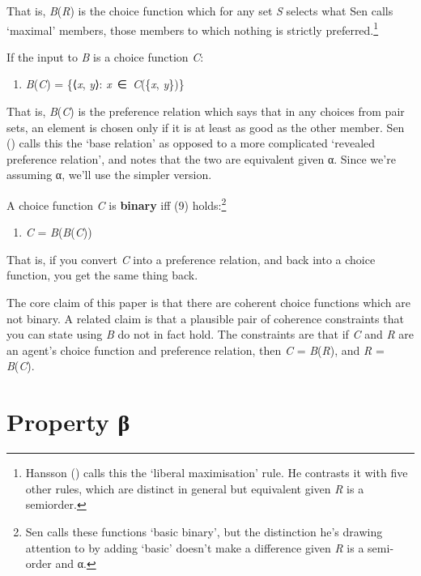 \documentclass[
  11pt,
  letterpaper,
  DIV=11,
  numbers=noendperiod,
  twoside]{scrartcl}
\providecommand{\tightlist}{%
  \setlength{\itemsep}{0pt}\setlength{\parskip}{0pt}}
\begin{document}
That is, \emph{B}(\emph{R}) is the choice function which for any set
\emph{S} selects what Sen calls `maximal' members, those members to
which nothing is strictly preferred.\footnote{Hansson
  () calls this the `liberal
  maximisation' rule. He contrasts it with five other rules, which are
  distinct in general but equivalent given \emph{R} is a semiorder.}

If the input to \emph{B} is a choice function \emph{C}:

\begin{enumerate}
\def\labelenumi{(\arabic{enumi})}
\setcounter{enumi}{7}
\tightlist
\item
  \emph{B}(\emph{C}) = \{⟨\emph{x}, \emph{y}⟩:
  \emph{x}~∈~\emph{C}(\{\emph{x}, \emph{y}\})\}
\end{enumerate}

That is, \emph{B}(\emph{C}) is the preference relation which says that
in any choices from pair sets, an element is chosen only if it is at
least as good as the other member. Sen
() calls this the `base
relation' as opposed to a more complicated `revealed preference
relation', and notes that the two are equivalent given α. Since we're
assuming α, we'll use the simpler version.

A choice function \emph{C} is \textbf{binary} iff (9) holds:\footnote{Sen
  calls these functions `basic binary', but the distinction he's drawing
  attention to by adding `basic' doesn't make a difference given
  \emph{R} is a semi-order and α.}

\begin{enumerate}
\def\labelenumi{(\arabic{enumi})}
\setcounter{enumi}{8}
\tightlist
\item
  \emph{C} = \emph{B}(\emph{B}(\emph{C}))
\end{enumerate}

That is, if you convert \emph{C} into a preference relation, and back
into a choice function, you get the same thing back.

The core claim of this paper is that there are coherent choice functions
which are not binary. A related claim is that a plausible pair of
coherence constraints that you can state using \emph{B} do not in fact
hold. The constraints are that if \emph{C} and \emph{R} are an agent's
choice function and preference relation, then \emph{C} =
\emph{B}(\emph{R}), and \emph{R} = \emph{B}(\emph{C}).

\section{Property β}\label{property-ux3b2}
\end{document}
